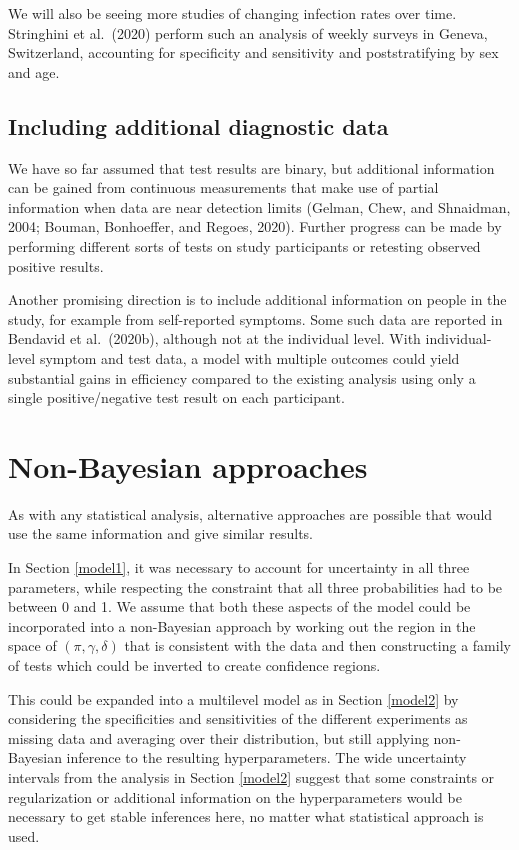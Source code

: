 \documentclass[11pt]{article}
\begin{document}
We will also be seeing more studies of changing infection rates over time.  Stringhini et al.\ (2020) perform such an analysis of weekly surveys in Geneva, Switzerland, accounting for specificity and sensitivity and poststratifying by sex and age.

\subsection{Including additional diagnostic data}
We have so far assumed that test results are binary, but additional information can be gained from continuous measurements that make use of partial information when data are near detection limits (Gelman, Chew, and Shnaidman, 2004; Bouman, Bonhoeffer, and Regoes, 2020).  Further progress can be made by performing different sorts of tests on study participants or retesting observed positive results.

Another promising direction is to include additional information on people in the study, for example from self-reported symptoms.  Some such data are reported in Bendavid et al.\ (2020b), although not at the individual level. With individual-level symptom and test data, a model with multiple outcomes could yield substantial gains in efficiency compared to the existing analysis using only a single positive/negative test result on each participant.

\section{Non-Bayesian approaches}\label{nonbayes}
As with any statistical analysis, alternative approaches are possible that would use the same information and  give similar results.

In Section \ref{model1}, it was necessary to account for uncertainty in all three parameters, while respecting the constraint that all three probabilities had to be between 0 and 1.  We assume that both these aspects of the model could be incorporated into a non-Bayesian approach by working out the region in the space of $(\pi,\gamma,\delta)$ that is consistent with the data and then constructing a family of tests which could be inverted to create confidence regions.

This could be expanded into a multilevel model as in Section \ref{model2} by considering the specificities and sensitivities of the different experiments as missing data and averaging over their distribution, but still applying non-Bayesian inference to the resulting hyperparameters.  The wide uncertainty intervals from the analysis in Section \ref{model2} suggest that some constraints or regularization or additional information on the hyperparameters would be necessary to get stable inferences here, no matter what statistical approach is used.
\end{document}
